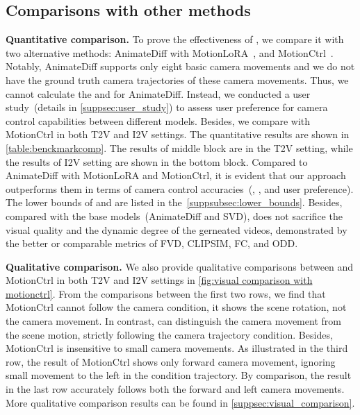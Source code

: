 \subsection{Comparisons with other methods} \label{subsec:benchmark_compare}
\noindent \textbf{Quantitative comparison.} To prove the effectiveness of \method, we compare it with two alternative methods: AnimateDiff with MotionLoRA~\citep{animatediff}, and MotionCtrl~\citep{motionctrl}.
%
Notably, AnimateDiff supports only eight basic camera movements and we do not have the ground truth camera trajectories of these camera movements. 
%
Thus, we cannot calculate the \rote and \te for AnimateDiff.
%
Instead, we conducted a user study~(details in \cref{suppsec:user_study}) to assess user preference for camera control capabilities between different models.
%
Besides, we compare \method with MotionCtrl in both T2V and I2V settings. 
%
The quantitative results are shown in \cref{table:benckmarkcomp}.
%
The results of middle block are in the T2V setting, while the results of I2V setting are shown in the bottom block.
%
Compared to AnimateDiff with MotionLoRA and MotionCtrl, it is evident that our approach outperforms them in terms of camera control accuracies~(\te, \rote, and user preference).
%
The lower bounds of \te and \rote are listed in the~\cref{suppsubsec:lower_bounds}.
%
Besides, compared with the base models~(AnimateDiff and SVD), \method does not sacrifice the visual quality and the dynamic degree of the gerneated videos, demonstrated by the better or comparable metrics of FVD, CLIPSIM, FC, and ODD.
%

\noindent \textbf{Qualitative comparison.} We also provide qualitative comparisons between \method and MotionCtrl in both T2V and I2V settings in \cref{fig:visual comparison with motionctrl}. 
%
From the comparisons between the first two rows, we find that MotionCtrl cannot follow the camera condition, it shows the scene rotation, not the camera movement.
%
In contrast, \method can distinguish the camera movement from the scene motion, strictly following the camera trajectory condition.
%
Besides, MotionCtrl is insensitive to small camera movements. 
%
As illustrated in the third row, the result of MotionCtrl shows only forward camera movement, ignoring small movement to the left in the condition trajectory.
%
By comparison, the \method result in the last row accurately follows both the forward and left camera movements.
%
More qualitative comparison results can be found in \cref{suppsec:visual_comparison}.

